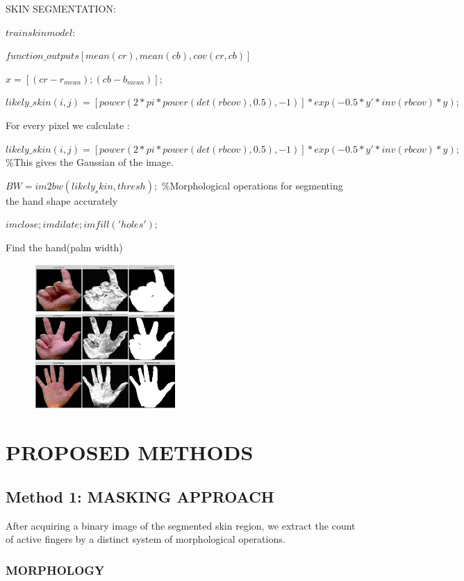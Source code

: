 \documentclass[conference]{IEEEtran}
\begin{document}
SKIN SEGMENTATION:

$train skin model : $

$function\_outputs[ mean(cr) ,mean(cb), cov(cr,cb)]$

$x = [(cr-r_{mean});(cb-b_{mean})];$

$likely\_skin(i,j) = [power(2*pi*power(det(rbcov),0.5),-1)]*exp(-0.5* y'*inv(rbcov)* y);$

For every pixel we calculate :

$likely\_skin(i,j) = [power(2*pi*power(det(rbcov),0.5),-1)]*exp(-0.5* y'*inv(rbcov)* y);$ \%This gives the Gaussian of the image. 

$BW = im2bw(likely_skin,thresh); $ \%Morphological operations for segmenting the hand shape accurately

$imclose;imdilate;imfill('holes');$

Find the hand(palm width) 

\begin{figure}[h!]
	\centering
	\includegraphics[width = 5.5cm, height = 5.5cm]{grid1}
\end{figure}



\section{PROPOSED METHODS}

\subsection{Method 1: MASKING APPROACH }

After acquiring a binary image of the segmented skin region, we extract the count of active fingers by a distinct system of morphological operations.


\subsubsection{MORPHOLOGY}
\end{document}
